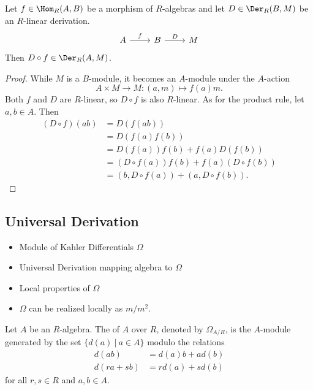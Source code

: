 \begin{proposition}
  \label{prop_precompose_derivation}
  Let $f \in \Hom_R(A,B)$ be a morphism of $R$-algebras and let $D \in \Der_R(B,M)$ be an $R$-linear derivation.
  \[ \begin{tikzcd} A \arrow{r}{f} & B \arrow{r}{D} & M \end{tikzcd} \]
  Then $D \circ f \in \Der_R(A,M)$.
\end{proposition}
\begin{proof}
  While $M$ is a $B$-module, it becomes an $A$-module under the $A$-action
    \[ A \times M \to M : (a, m) \mapsto f(a)m. \]
  Both $f$ and $D$ are $R$-linear, so $D \circ f$ is also $R$-linear.
  As for the product rule, let $a, b \in A$. Then
  \begin{align*}
    (D \circ f)(ab)
      &= D(f(ab)) \\
      &= D(f(a)f(b)) \\
      &= D(f(a))f(b) + f(a)D(f(b)) \\
      &= (D \circ f(a))f(b) + f(a)(D \circ f(b)) \\
      &= (b, D \circ f(a)) + (a, D \circ f(b)).
  \end{align*}
\end{proof}



\subsection{Universal Derivation}


\begin{itemize}
  \item Module of Kahler Differentials $\Omega$
  \item Universal Derivation mapping algebra to $\Omega$
  \item Local properties of $\Omega$
  \item $\Omega$ can be realized locally as $m/m^2$.
\end{itemize}

\begin{definition}
  Let $A$ be an $R$-algebra.
  The  of $A$ over $R$,
  denoted by $\Omega_{A/R}$,
  is the $A$-module generated by the set $\{ d(a) ~|~ a \in A \}$
  modulo the relations
  \begin{align*}
    d(ab) &= d(a)b + ad(b) \\
    d(ra + sb) &= rd(a) + sd(b)
  \end{align*}
  for all $r, s \in R$ and $a, b \in A$.
\end{definition}

